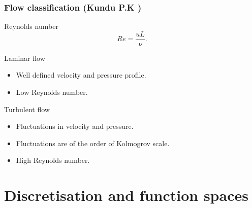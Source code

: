 \documentclass{beamer}
\begin{document}
\begin{frame}
\frametitle{Flow classification (Kundu P.K \cite{Kundu})}
\begin{block}{Reynolds number}
\begin{equation} \label{reynolds_number}
Re =  \frac{uL}{\nu} \textrm{.}
\end{equation}
\end{block}
\begin{block}{Laminar flow}
\begin{itemize}
\item Well defined velocity and pressure profile.
\item Low Reynolds number.
\end{itemize}
\end{block}
\begin{block}{Turbulent flow}
\begin{itemize}
\item Fluctuations in velocity and pressure.
\item Fluctuations are of the order of Kolmogrov scale.
\item High Reynolds number.
\end{itemize}
\end{block}
\end{frame}


\section{Discretisation and function spaces} %
\end{document}
